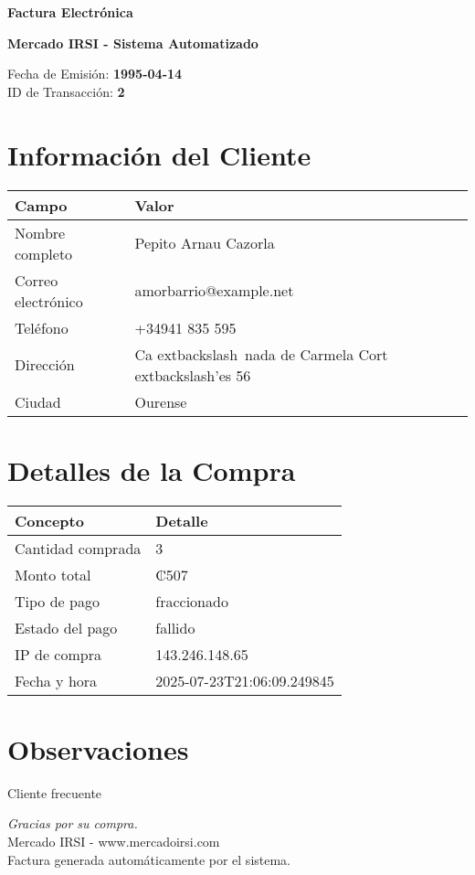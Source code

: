 \documentclass[10pt]{article}
\begin{document}
\begin{center}
    \Huge \textbf{Factura Electrónica}

    \vspace{0.3cm}
    \large \textbf{Mercado IRSI - Sistema Automatizado}

    \vspace{0.5cm}
    \normalsize Fecha de Emisión: \textbf{1995-04-14} \\
    ID de Transacción: \textbf{2} \\
\end{center}

\vspace{1cm}

\section*{Información del Cliente}
\begin{tabularx}{\textwidth}{>{\raggedright\arraybackslash}p{4cm} X}
\rowcolor{lightgray}
\textbf{Campo} & \textbf{Valor} \\
\hline
Nombre completo & Pepito Arnau Cazorla \\
Correo electrónico & amorbarrio@example.net \\
Teléfono & +34941 835 595 \\
Dirección & Ca	extbackslash{}~{n}ada de Carmela Cort	extbackslash{}'{e}s 56 \\
Ciudad & Ourense \\
\end{tabularx}

\vspace{0.8cm}

\section*{Detalles de la Compra}
\begin{tabularx}{\textwidth}{>{\raggedright\arraybackslash}p{6cm} X}
\rowcolor{lightgray}
\textbf{Concepto} & \textbf{Detalle} \\
\hline
Cantidad comprada & 3 \\
Monto total & ₡507 \\
Tipo de pago & fraccionado \\
Estado del pago & fallido \\
IP de compra & 143.246.148.65 \\
Fecha y hora & 2025-07-23T21:06:09.249845 \\
\end{tabularx}

\vspace{1.5cm}

\section*{Observaciones}
Cliente frecuente

\vfill

\begin{center}
    \textit{Gracias por su compra.} \\
    Mercado IRSI - www.mercadoirsi.com \\
    Factura generada automáticamente por el sistema.
\end{center}
\end{document}
